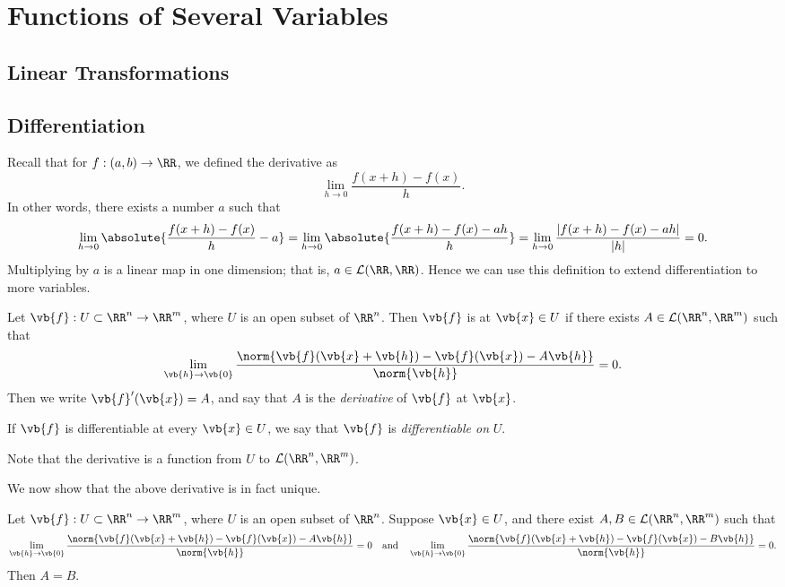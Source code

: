\chapter{Functions of Several Variables}
\section{Linear Transformations}


\section{Differentiation}
Recall that for $f:(a,b)\to\RR$, we defined the derivative as
\[\lim_{h\to0}\frac{f(x+h)-f(x)}{h}.\]
In other words, there exists a number $a$ such that
\[\lim_{h\to0}\absolute{\frac{f(x+h)-f(x)}{h}-a}=\lim_{h\to0}\absolute{\frac{f(x+h)-f(x)-ah}{h}}=\lim_{h\to0}\frac{|f(x+h)-f(x)-ah|}{|h|}=0.\]
Multiplying by $a$ is a linear map in one dimension; that is, $a\in\mathcal{L}(\RR,\RR)$. Hence we can use this definition to extend differentiation to more variables.

\begin{definition}
Let $\vb{f}:U\subset\RR^n\to\RR^m$, where $U$ is an open subset of $\RR^n$. Then $\vb{f}$ is  at $\vb{x}\in U$ if there exists $A\in\mathcal{L}(\RR^n,\RR^m)$ such that
\[\lim_{\vb{h}\to\vb{0}}\frac{\norm{\vb{f}(\vb{x}+\vb{h})-\vb{f}(\vb{x})-A\vb{h}}}{\norm{\vb{h}}}=0.\]
Then we write $\vb{f}^\prime(\vb{x})=A$, and say that $A$ is the \emph{derivative} of $\vb{f}$ at $\vb{x}$.

If $\vb{f}$ is differentiable at every $\vb{x}\in U$, we say that $\vb{f}$ is \emph{differentiable on} $U$. 
\end{definition}

Note that the derivative is a function from $U$ to $\mathcal{L}(\RR^n,\RR^m)$.

We now show that the above derivative is in fact unique.

\begin{lemma}
Let $\vb{f}:U\subset\RR^n\to\RR^m$, where $U$ is an open subset of $\RR^n$. Suppose $\vb{x}\in U$, and there exist $A,B\in\mathcal{L}(\RR^n,\RR^m)$ such that
\[\lim_{\vb{h}\to\vb{0}}\frac{\norm{\vb{f}(\vb{x}+\vb{h})-\vb{f}(\vb{x})-A\vb{h}}}{\norm{\vb{h}}}=0\quad\text{and}\quad\lim_{\vb{h}\to\vb{0}}\frac{\norm{\vb{f}(\vb{x}+\vb{h})-\vb{f}(\vb{x})-B\vb{h}}}{\norm{\vb{h}}}=0.\]
Then $A=B$.
\end{lemma}

